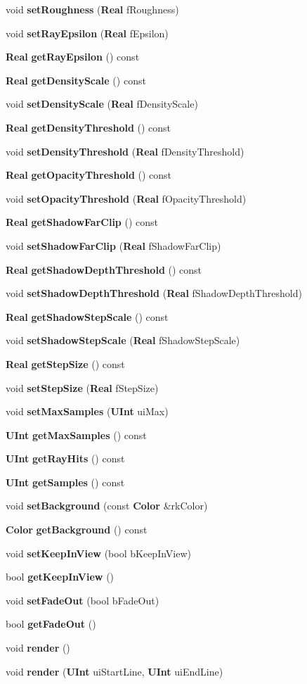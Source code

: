 \begin{CompactItemize}
void {\bf set\-Roughness} ({\bf Real} f\-Roughness)
\item 
void {\bf set\-Ray\-Epsilon} ({\bf Real} f\-Epsilon)
\item 
{\bf Real} {\bf get\-Ray\-Epsilon} () const
\item 
{\bf Real} {\bf get\-Density\-Scale} () const
\item 
void {\bf set\-Density\-Scale} ({\bf Real} f\-Density\-Scale)
\item 
{\bf Real} {\bf get\-Density\-Threshold} () const
\item 
void {\bf set\-Density\-Threshold} ({\bf Real} f\-Density\-Threshold)
\item 
{\bf Real} {\bf get\-Opacity\-Threshold} () const
\item 
void {\bf set\-Opacity\-Threshold} ({\bf Real} f\-Opacity\-Threshold)
\item 
{\bf Real} {\bf get\-Shadow\-Far\-Clip} () const
\item 
void {\bf set\-Shadow\-Far\-Clip} ({\bf Real} f\-Shadow\-Far\-Clip)
\item 
{\bf Real} {\bf get\-Shadow\-Depth\-Threshold} () const
\item 
void {\bf set\-Shadow\-Depth\-Threshold} ({\bf Real} f\-Shadow\-Depth\-Threshold)
\item 
{\bf Real} {\bf get\-Shadow\-Step\-Scale} () const
\item 
void {\bf set\-Shadow\-Step\-Scale} ({\bf Real} f\-Shadow\-Step\-Scale)
\item 
{\bf Real} {\bf get\-Step\-Size} () const
\item 
void {\bf set\-Step\-Size} ({\bf Real} f\-Step\-Size)
\item 
void {\bf set\-Max\-Samples} ({\bf UInt} ui\-Max)
\item 
{\bf UInt} {\bf get\-Max\-Samples} () const
\item 
{\bf UInt} {\bf get\-Ray\-Hits} () const
\item 
{\bf UInt} {\bf get\-Samples} () const
\item 
void {\bf set\-Background} (const {\bf Color} \&rk\-Color)
\item 
{\bf Color} {\bf get\-Background} () const
\item 
void {\bf set\-Keep\-In\-View} (bool b\-Keep\-In\-View)
\item 
bool {\bf get\-Keep\-In\-View} ()
\item 
void {\bf set\-Fade\-Out} (bool b\-Fade\-Out)
\item 
bool {\bf get\-Fade\-Out} ()
\item 
void {\bf render} ()
\item 
void {\bf render} ({\bf UInt} ui\-Start\-Line, {\bf UInt} ui\-End\-Line)
\end{CompactItemize}


